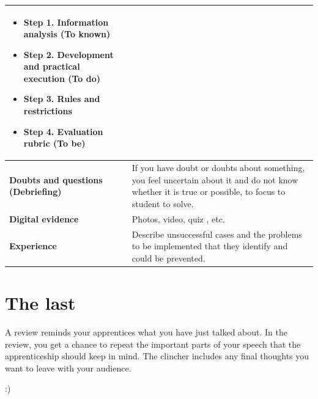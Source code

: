 \documentclass[12pt]{article}
\begin{document}
\begin{table}[H]
\begin{center}
\begin{tabular}{p{3.5cm} p{10cm}}
\begin{itemize}
    \item \bf{Step 1.} Information analysis (To known)
        \item \bf{Step 2.} Development and practical execution (To do)
            \item \bf{Step 3.} Rules and restrictions
                \item \bf{Step 4.} Evaluation rubric (To be)
\end{itemize}
\\ \hline
\bf{Doubts and questions (Debriefing)} & If you have doubt or doubts about something, you feel uncertain about it and do not know whether it is true or possible, to focus to student to solve. \\  \hline
\bf{Digital evidence} & Photos, video, quiz , etc. \\ \hline
\bf{Experience} & Describe unsuccessful cases and the problems to be implemented that they identify and could be prevented. \\ \hline
\end{tabular}
\label{tab:coches}
\end{center}
\end{table}

\section{The last}

A review reminds your apprentices what you have just talked about. In the review, you get a chance to repeat the important parts of your speech that the apprenticeship should keep in mind.
The clincher includes any final thoughts you want to leave with your audience. 

\vskip 0.2cm
\centering :)


%
\end{document}
